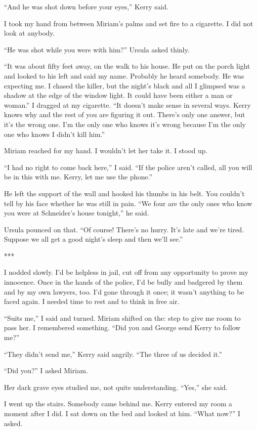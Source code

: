 {“And he was shot down before your eyes,” Kerry said.

I took my hand from between Miriam’s palms and set fire to a cigarette. I did not look at anybody.

“He was shot while you were with him?” Ursula asked thinly.

“It was about fifty feet away, on the walk to his house. He put on the porch light and looked to his left and said my name. Probably he heard somebody. He was expecting me. I chased the killer, but the night’s black and all I glimpsed was a shadow at the edge of the window light. It could have been either a man or woman.” I dragged at my cigarette. “It doesn’t make sense in several ways. Kerry knows why and the rest of you are figuring it out. There’s only one answer, but it’s the wrong one. I’m the only one who knows it’s wrong because I’m the only one who knows I didn’t kill him.”

Miriam reached for my hand. I wouldn’t let her take it. I stood up.

“I had no right to come back here,” I said. “If the police aren’t called, all you will be in this with me. Kerry, let me use the phone.”

He left the support of the wall and hooked his thumbs in his belt. You couldn’t tell by his face whether he was still in pain. “We four are the only ones who know you were at Schneider’s house tonight,” he said.

Ursula pounced on that. “Of course! There’s no hurry. It’s late and we’re tired. Suppose we all get a good night’s sleep and then we’ll see.”

***

I nodded slowly. I’d be helpless in jail, cut off from any opportunity to prove my innocence. Once in the hands of the police, I’d be bully and badgered by them and by my own lawyers, too. I’d gone through it once; it wasn’t anything to be faced again. I needed time to rest and to think in free air.

“Suits me,” I said and turned. Miriam shifted on the: step to give me room to pass her. I remembered something. “Did you and George send Kerry to follow me?”

“They didn’t send me,” Kerry said angrily. “The three of us decided it.”

“Did you?” I asked Miriam.

Her dark grave eyes studied me, not quite understanding. “Yes,” she said.

I went up the stairs. Somebody came behind me. Kerry entered my room a moment after I did. I sat down on the bed and looked at him. “What now?” I asked.

}
